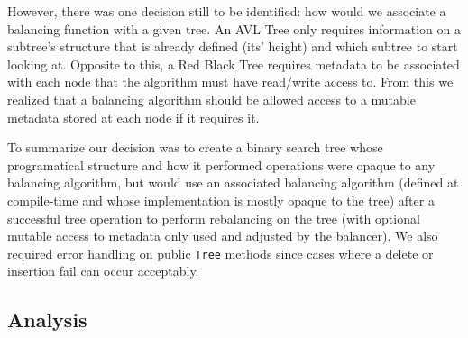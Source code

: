 \documentclass[11pt, letterpaper]{article}
\begin{document}
However, there was one decision still to be identified: how would we associate a balancing function with a given tree.
An AVL Tree only requires information on a subtree's structure that is already defined (its' height) and which subtree to start looking at.
Opposite to this, a Red Black Tree requires metadata to be associated with each node that the algorithm must have read/write access to.
From this we realized that a balancing algorithm should be allowed access to a mutable metadata stored at each node if it requires it.

To summarize our decision was to create a binary search tree whose programatical structure and how it performed operations were opaque
to any balancing algorithm, but would use an associated balancing algorithm (defined at compile-time and whose implementation is mostly opaque to the tree)
after a successful tree operation to perform rebalancing on the tree (with optional mutable access to metadata only used and adjusted by the balancer).
We also required error handling on public \texttt{Tree} methods since cases where a delete or insertion fail can occur acceptably.

\subsection{Analysis}
\end{document}
